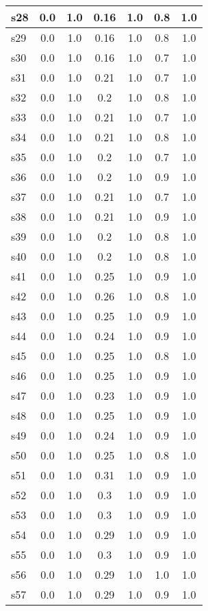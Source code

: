 \documentclass{article}
\begin{document}
\begin{tabular}{|l|c|c|c|c|c|c|}
\hline
s28 &0.0 & 1.0 & 0.16 & 1.0 & 0.8 & 1.0\\
\hline
s29 &0.0 & 1.0 & 0.16 & 1.0 & 0.8 & 1.0\\
\hline
s30 &0.0 & 1.0 & 0.16 & 1.0 & 0.7 & 1.0\\
\hline
s31 &0.0 & 1.0 & 0.21 & 1.0 & 0.7 & 1.0\\
\hline
s32 &0.0 & 1.0 & 0.2 & 1.0 & 0.8 & 1.0\\
\hline
s33 &0.0 & 1.0 & 0.21 & 1.0 & 0.7 & 1.0\\
\hline
s34 &0.0 & 1.0 & 0.21 & 1.0 & 0.8 & 1.0\\
\hline
s35 &0.0 & 1.0 & 0.2 & 1.0 & 0.7 & 1.0\\
\hline
s36 &0.0 & 1.0 & 0.2 & 1.0 & 0.9 & 1.0\\
\hline
s37 &0.0 & 1.0 & 0.21 & 1.0 & 0.7 & 1.0\\
\hline
s38 &0.0 & 1.0 & 0.21 & 1.0 & 0.9 & 1.0\\
\hline
s39 &0.0 & 1.0 & 0.2 & 1.0 & 0.8 & 1.0\\
\hline
s40 &0.0 & 1.0 & 0.2 & 1.0 & 0.8 & 1.0\\
\hline
s41 &0.0 & 1.0 & 0.25 & 1.0 & 0.9 & 1.0\\
\hline
s42 &0.0 & 1.0 & 0.26 & 1.0 & 0.8 & 1.0\\
\hline
s43 &0.0 & 1.0 & 0.25 & 1.0 & 0.9 & 1.0\\
\hline
s44 &0.0 & 1.0 & 0.24 & 1.0 & 0.9 & 1.0\\
\hline
s45 &0.0 & 1.0 & 0.25 & 1.0 & 0.8 & 1.0\\
\hline
s46 &0.0 & 1.0 & 0.25 & 1.0 & 0.9 & 1.0\\
\hline
s47 &0.0 & 1.0 & 0.23 & 1.0 & 0.9 & 1.0\\
\hline
s48 &0.0 & 1.0 & 0.25 & 1.0 & 0.9 & 1.0\\
\hline
s49 &0.0 & 1.0 & 0.24 & 1.0 & 0.9 & 1.0\\
\hline
s50 &0.0 & 1.0 & 0.25 & 1.0 & 0.8 & 1.0\\
\hline
s51 &0.0 & 1.0 & 0.31 & 1.0 & 0.9 & 1.0\\
\hline
s52 &0.0 & 1.0 & 0.3 & 1.0 & 0.9 & 1.0\\
\hline
s53 &0.0 & 1.0 & 0.3 & 1.0 & 0.9 & 1.0\\
\hline
s54 &0.0 & 1.0 & 0.29 & 1.0 & 0.9 & 1.0\\
\hline
s55 &0.0 & 1.0 & 0.3 & 1.0 & 0.9 & 1.0\\
\hline
s56 &0.0 & 1.0 & 0.29 & 1.0 & 1.0 & 1.0\\
\hline
s57 &0.0 & 1.0 & 0.29 & 1.0 & 0.9 & 1.0\\

\end{tabular}
\end{document}
